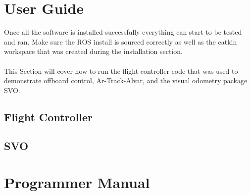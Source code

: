 \section{User Guide}
Once all the software is installed successfully everything can start to be tested and ran. Make sure the ROS install is sourced correctly as well as the catkin workspace that was created during the installation section.\\
\\
This Section will cover how to run the flight controller code that was used to demonstrate offboard control, Ar-Track-Alvar, and the visual odometry package SVO.
\subsection{Flight Controller}
\subsection{SVO}
\section{Programmer Manual}

